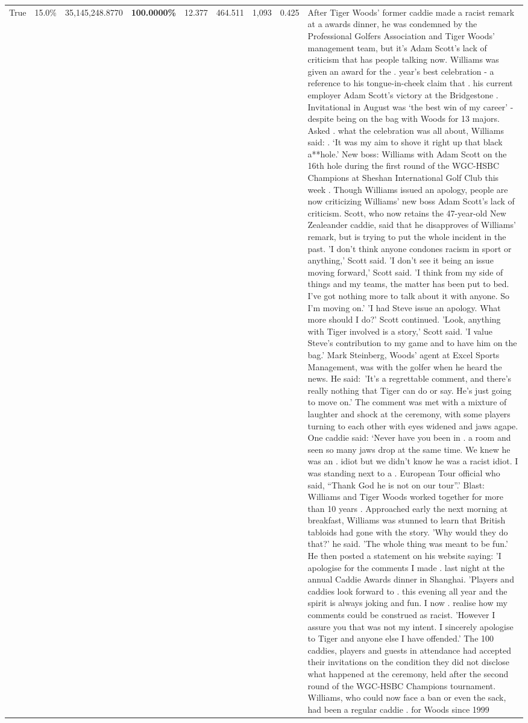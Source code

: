 \begin{table}[H]
\begin{tabular}{lllrlllll}
True & 15.0\% & 35,145,248.8770 & \bfseries \color{red} 100.0000\% & 12.377 & 464.511 & 1,093 & 0.425 & After Tiger Woods' former caddie made a racist remark at a awards dinner, he was condemned by the Professional Golfers Association and Tiger Woods' management team, but it's Adam Scott's lack of criticism that has people talking now. Williams was given an award for the . year’s best celebration - a reference to his tongue-in-cheek claim that . his current employer Adam Scott’s victory at the Bridgestone . Invitational in August was ‘the best win of my career’ - despite being on the bag with Woods for 13 majors. Asked . what the celebration was all about, Williams said: . ‘It was my aim to shove it right up that black a**hole.’ New boss: Williams with Adam Scott  on the 16th hole during the first round of the WGC-HSBC Champions at Sheshan International Golf Club this week . Though Williams issued an apology, people are now criticizing Williams' new boss Adam Scott's lack of criticism. Scott, who now retains the 47-year-old New Zealeander caddie, said that he disapproves of Williams' remark, but is trying to put the whole incident in the past. 'I don't think anyone condones racism in sport or anything,' Scott said. 'I don't see it being an issue moving forward,' Scott said. 'I think from my side of things and my teams, the matter has been put to bed. I've got nothing more to talk about it with anyone. So I'm moving on.' 'I had Steve issue an apology. What more should I do?' Scott continued. 'Look, anything with Tiger involved is a story,' Scott said. 'I value Steve's contribution to my game and to have him on the bag.' Mark Steinberg, Woods' agent at Excel Sports Management, was with the golfer when he heard the news. He said: 'It's a regrettable comment, and there's really nothing that Tiger can do or say. He's just going to move on.' The comment was met with a mixture of laughter and shock at the ceremony, with some players turning to each other with eyes widened and jaws agape. One caddie said: ‘Never have you been in . a room and seen so many jaws drop at the same time. We knew he was an . idiot but we didn’t know he was a racist idiot. I was standing next to a . European Tour official who said, “Thank God he is not on our tour”.’ Blast: Williams and Tiger Woods worked together for more than 10 years . Approached early the next morning at breakfast, Williams was stunned to learn that British tabloids had gone with the story. 'Why would they do that?' he said. 'The whole thing was meant to be fun.' He then posted a statement on his website saying: 'I apologise for the comments I made . last night at the annual Caddie Awards dinner in Shanghai. 'Players and caddies look forward to . this evening all year and the spirit is always joking and fun. I now . realise how my comments could be construed as racist. 'However I assure you that was not my intent. I sincerely apologise to Tiger and anyone else I have offended.' The 100 caddies, players and guests in attendance had accepted their invitations on the condition they did not disclose what happened at the ceremony, held after the second round of the WGC-HSBC Champions tournament. Williams, who could now face a ban or even the sack, had been a regular caddie . for Woods since 1999 
\end{tabular}
\end{table}
